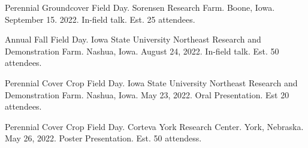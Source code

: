 

\begin{cvparagraph}

Perennial Groundcover Field Day. Sorensen Research Farm. Boone, Iowa. September 15. 2022. In-field talk. Est. 25 attendees.

Annual Fall Field Day. Iowa State University Northeast Research and Demonstration Farm. Nashua, Iowa. August 24, 2022. In-field talk. Est. 50 attendees.

Perennial Cover Crop Field Day. Iowa State University Northeast Research and Demonstration Farm. Nashua, Iowa. May 23, 2022. Oral Presentation. Est 20 attendees.

Perennial Cover Crop Field Day. Corteva York Research Center. York, Nebraska. May 26, 2022. Poster Presentation. Est. 50 attendess.

\end{cvparagraph}